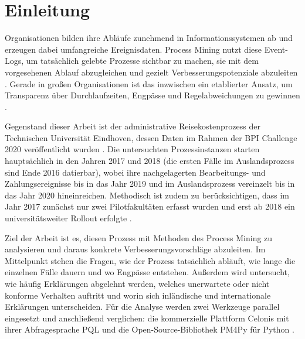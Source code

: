 \section{Einleitung}
\label{sec:einleitung}

%

Organisationen bilden ihre Abläufe zunehmend in Informationssystemen ab und erzeugen dabei umfangreiche Ereignisdaten.
Process Mining nutzt diese Event-Logs, um tatsächlich gelebte Prozesse sichtbar zu machen, sie mit dem vorgesehenen Ablauf abzugleichen und gezielt Verbesserungspotenziale abzuleiten \parencite{van_der_aalst_process_2016}.
Gerade in großen Organisationen ist das inzwischen ein etablierter Ansatz, um Transparenz über Durchlaufzeiten, Engpässe und Regelabweichungen zu gewinnen \parencite{reinkemeyer_process_2020}.

Gegenstand dieser Arbeit ist der administrative Reisekostenprozess der Technischen Universität Eindhoven,
dessen Daten im Rahmen der BPI Challenge 2020 veröffentlicht wurden \parencite{van_dongen_bpi_2020}.
Die untersuchten Prozessinstanzen starten hauptsächlich in den Jahren 2017 und 2018 (die ersten Fälle im Auslandsprozess sind Ende 2016 datierbar),
wobei ihre nachgelagerten Bearbeitungs- und Zahlungsereignisse bis in das Jahr 2019 und im Auslandsprozess vereinzelt bis in das Jahr 2020 hineinreichen.
Methodisch ist zudem zu berücksichtigen, dass im Jahr 2017 zunächst nur zwei Pilotfakultäten erfasst wurden und erst ab 2018 ein universitätsweiter Rollout erfolgte \parencite{van_dongen_bpi_2020}.

Ziel der Arbeit ist es, diesen Prozess mit Methoden des Process Mining zu analysieren und daraus konkrete Verbesserungsvorschläge abzuleiten.
Im Mittelpunkt stehen die Fragen, wie der Prozess tatsächlich abläuft, wie lange die einzelnen Fälle dauern und wo Engpässe entstehen. Außerdem wird untersucht, wie häufig Erklärungen abgelehnt werden, welches unerwartete oder nicht konforme Verhalten auftritt und worin sich inländische und internationale Erklärungen unterscheiden. Für die Analyse werden zwei Werkzeuge parallel eingesetzt und anschließend verglichen: die kommerzielle Plattform Celonis mit ihrer Abfragesprache PQL \parencite{vogelgesang_celonis_2022} und die Open-Source-Bibliothek PM4Py für Python \parencite{berti_process_2019}.

